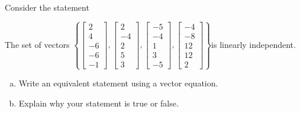 
\begin{exerciseStatement}


Consider the statement 
\begin{center}\begin{minipage}{0.8\textwidth}
 The set of vectors \( \left\{ \left[\begin{array}{c}
2 \\
4 \\
-6 \\
-6 \\
-1
\end{array}\right] , \left[\begin{array}{c}
2 \\
-4 \\
2 \\
5 \\
3
\end{array}\right] , \left[\begin{array}{c}
-5 \\
-4 \\
1 \\
3 \\
-5
\end{array}\right] , \left[\begin{array}{c}
-4 \\
-8 \\
12 \\
12 \\
2
\end{array}\right] \right\} \)is linearly independent.
\end{minipage}\end{center}
    


\begin{enumerate}[(a)]
\item  Write an equivalent statement using a vector equation.
\item  Explain why your statement is true or false.
\end{enumerate}
    
\end{exerciseStatement}
    

